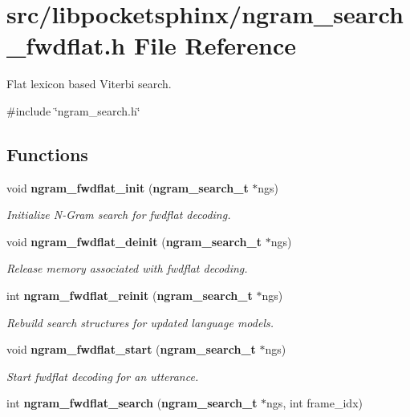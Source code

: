 \section{src/libpocketsphinx/ngram\-\_\-search\-\_\-fwdflat.h \-File \-Reference}
\label{ngram__search__fwdflat_8h}


\-Flat lexicon based \-Viterbi search.  


{\ttfamily \#include \char`\"{}ngram\-\_\-search.\-h\char`\"{}}\*
\subsection*{\-Functions}
\begin{DoxyCompactItemize}
\item 
void {\bf ngram\-\_\-fwdflat\-\_\-init} ({\bf ngram\-\_\-search\-\_\-t} $\ast$ngs)\label{ngram__search__fwdflat_8h_ad4b8ebd904c77f8a28f59cd5ca2c8307}

\begin{DoxyCompactList}\small\item\em \-Initialize \-N-\/\-Gram search for fwdflat decoding. \end{DoxyCompactList}\item 
void {\bf ngram\-\_\-fwdflat\-\_\-deinit} ({\bf ngram\-\_\-search\-\_\-t} $\ast$ngs)\label{ngram__search__fwdflat_8h_a8faf467f90162a7273b23304fc6e8586}

\begin{DoxyCompactList}\small\item\em \-Release memory associated with fwdflat decoding. \end{DoxyCompactList}\item 
int {\bf ngram\-\_\-fwdflat\-\_\-reinit} ({\bf ngram\-\_\-search\-\_\-t} $\ast$ngs)\label{ngram__search__fwdflat_8h_aa4879c06ddbc455a6f355084a9c574b4}

\begin{DoxyCompactList}\small\item\em \-Rebuild search structures for updated language models. \end{DoxyCompactList}\item 
void {\bf ngram\-\_\-fwdflat\-\_\-start} ({\bf ngram\-\_\-search\-\_\-t} $\ast$ngs)\label{ngram__search__fwdflat_8h_a763c2c7aaa5d7f9c5107af73552a2149}

\begin{DoxyCompactList}\small\item\em \-Start fwdflat decoding for an utterance. \end{DoxyCompactList}\item 
int {\bf ngram\-\_\-fwdflat\-\_\-search} ({\bf ngram\-\_\-search\-\_\-t} $\ast$ngs, int frame\-\_\-idx)\label{ngram__search__fwdflat_8h_ae77ef21ae92dbcc4b14f40469fbd4307}


\end{DoxyCompactItemize}
